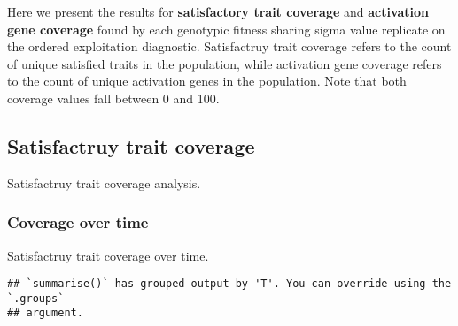 \documentclass[]{book}
\newenvironment{Shaded}{\begin{snugshade}}{\end{snugshade}}
\newcommand{\DataTypeTok}[1]{\textcolor[rgb]{0.13,0.29,0.53}{#1}}
\newcommand{\KeywordTok}[1]{\textcolor[rgb]{0.13,0.29,0.53}{\textbf{#1}}}
\newcommand{\NormalTok}[1]{#1}
\newcommand{\OperatorTok}[1]{\textcolor[rgb]{0.81,0.36,0.00}{\textbf{#1}}}
\newcommand{\StringTok}[1]{\textcolor[rgb]{0.31,0.60,0.02}{#1}}
\begin{document}
Here we present the results for \textbf{satisfactory trait coverage} and \textbf{activation gene coverage} found by each genotypic fitness sharing sigma value replicate on the ordered exploitation diagnostic.
Satisfactruy trait coverage refers to the count of unique satisfied traits in the population, while activation gene coverage refers to the count of unique activation genes in the population.
Note that both coverage values fall between 0 and 100.

\hypertarget{satisfactruy-trait-coverage}{%
\subsection{Satisfactruy trait coverage}\label{satisfactruy-trait-coverage}}

Satisfactruy trait coverage analysis.

\hypertarget{coverage-over-time-2}{%
\subsubsection{Coverage over time}\label{coverage-over-time-2}}

Satisfactruy trait coverage over time.

\begin{Shaded}
\end{Shaded}

\begin{verbatim}
## `summarise()` has grouped output by 'T'. You can override using the `.groups`
## argument.
\end{verbatim}
\end{document}
